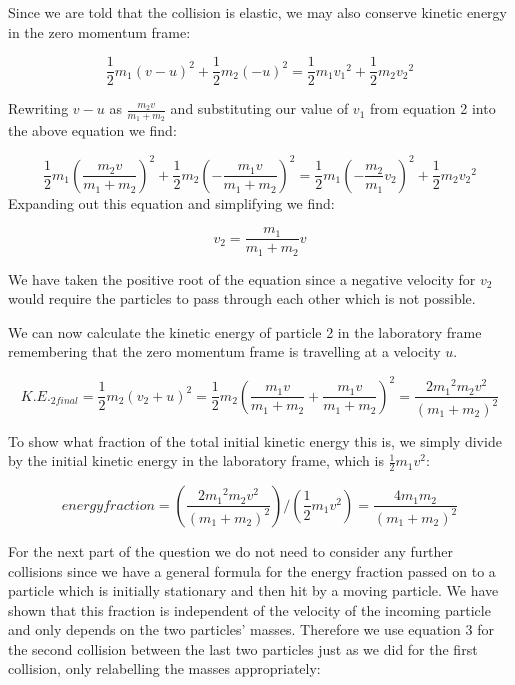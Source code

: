 \begin{problem}
{Since we are told that the collision is elastic, we may also conserve kinetic energy in the zero momentum frame:

\begin{equation*}\frac{1}{2}m_1 (v-u)^2+\frac{1}{2}m_2(-u)^2=\frac{1}{2}m_1{v_1}^2+\frac{1}{2}m_2{v_2}^2\end{equation*}

Rewriting $v-u$ as $\frac{m_2 v}{m_1 + m_2}$ and substituting our value of $v_1$ from equation 2 into the above equation we find:

\begin{equation*}\frac{1}{2}m_1 \left(\frac{m_2 v}{m_1 + m_2}\right)^2+\frac{1}{2}m_2\left(-\frac{m_1 v}{m_1 + m_2}\right)^2=\frac{1}{2}m_1\left({-\frac{m_2}{m_1}v_2}\right)^2+\frac{1}{2}m_2{v_2}^2\end{equation*}
Expanding out this equation and simplifying we find:

\begin{equation*}v_2=\frac{m_1}{m_1 + m_2}v\end{equation*}

We have taken the positive root of the equation since a negative velocity for $v_2$ would require the particles to pass through each other which is not possible. 

We can now calculate the kinetic energy of particle 2 in the laboratory frame remembering that the zero momentum frame is travelling at a velocity $u$.

\begin{equation*}K.E._{2final}=\frac{1}{2}m_2\left(v_2 + u\right)^2=\frac{1}{2}m_2\left(\frac{m_1v}{m_1 + m_2}+ \frac{m_1 v}{m_1 + m_2}\right)^2=\frac{2{m_1}^2m_2v^2}{\left(m_1 + m_2\right)^2}\end{equation*}

To show what fraction of the total initial kinetic energy this is, we simply divide by the initial kinetic energy in the laboratory frame, which is $\frac{1}{2}m_1v^2$:

\begin{equation}energy fraction=\left(\frac{2{m_1}^2m_2v^2}{\left(m_1 + m_2\right)^2}\right)/\left(\frac{1}{2}m_1v^2\right)=\frac{4m_{1}m_{2}}{(m_{1}+m_{2})^{2}}\end{equation}

For the next part of the question we do not need to consider any further collisions since we have a general formula for the energy fraction passed on to a particle which is initially stationary and then hit by a moving particle. We have shown that this fraction is independent of the velocity of the incoming particle and only depends on the two particles' masses. Therefore we use equation 3 for the second collision between the last two particles just as we did for the first collision, only relabelling the masses appropriately:

}
\end{problem}
